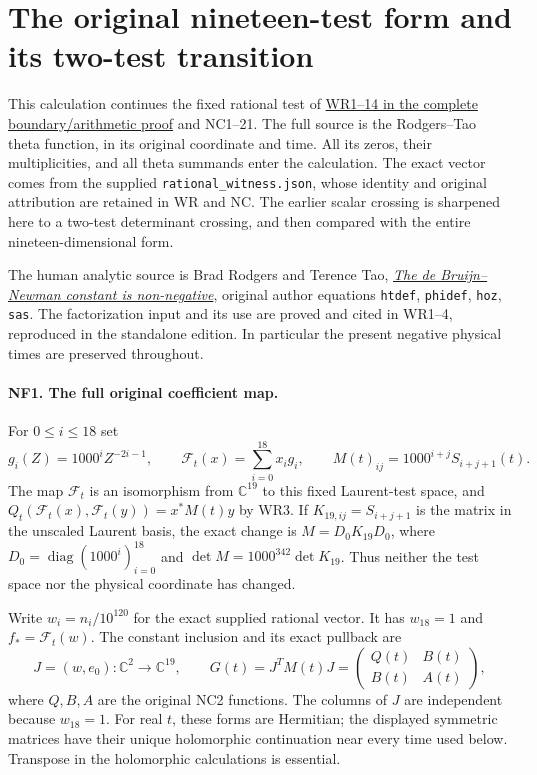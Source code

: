 \section{The original nineteen-test form and its two-test transition}
\label{sec:native-full-flag}

This calculation continues the fixed rational test of
\href{https://github.com/KokunoYumeto/zeta-function-research-reader/blob/87e386271c488ce5914b9926c4d23d0857e0c367/workbenches/splitzero-tandem/continuations/20260923-boundary-residue-arithmetic/BOUNDARY_RESIDUE_ARITHMETIC_RECEIVERS.tex}
{WR1--14 in the complete boundary/arithmetic proof} and
NC1--21. The full source is the Rodgers--Tao theta function, in its
original coordinate and time. All its zeros, their multiplicities,
and all theta summands enter the calculation. The exact vector comes
from the supplied \texttt{rational\_witness.json}, whose identity and
original attribution are retained in WR and NC. The earlier scalar
crossing is sharpened here to a two-test determinant crossing, and
then compared with the entire nineteen-dimensional form.

The human analytic source is Brad Rodgers and Terence Tao,
\href{https://arxiv.org/abs/1801.05914v5}{\emph{The de Bruijn--Newman
constant is non-negative}}, original author equations
\texttt{htdef}, \texttt{phidef}, \texttt{hoz}, \texttt{sas}.
The factorization input and its use are proved and cited in WR1--4,
reproduced in the standalone edition. In particular the present
negative physical times are preserved throughout.

\paragraph{NF1. The full original coefficient map.}
For $0\le i\le18$ set
\[
 g_i(Z)=1000^iZ^{-2i-1},\qquad
 \mathcal F_t(x)=\sum_{i=0}^{18}x_i g_i,
 \qquad M(t)_{ij}=1000^{i+j}S_{i+j+1}(t).
 \tag{NF1}
\]
The map $\mathcal F_t$ is an isomorphism from $\mathbb C^{19}$ to
this fixed Laurent-test space, and
$Q_t(\mathcal F_t(x),\mathcal F_t(y))=x^*M(t)y$ by WR3.
If $K_{19,ij}=S_{i+j+1}$ is the matrix in the unscaled Laurent
basis, the exact change is $M=D_0K_{19}D_0$, where
$D_0=\operatorname{diag}(1000^i)_{i=0}^{18}$ and
$\det M=1000^{342}\det K_{19}$. Thus neither the test space nor
the physical coordinate has changed.

Write $w_i=n_i/10^{120}$ for the exact supplied rational vector.
It has $w_{18}=1$ and $f_* =\mathcal F_t(w)$. The constant
inclusion and its exact pullback are
\[
 J=(w,e_0):\mathbb C^2\longrightarrow\mathbb C^{19},\qquad
 G(t)=J^TM(t)J=
 \begin{pmatrix}Q(t)&B(t)\\B(t)&A(t)\end{pmatrix},
 \tag{NF2}
\]
where $Q,B,A$ are the original NC2 functions. The columns of $J$
are independent because $w_{18}=1$. For real $t$, these forms are
Hermitian; the displayed symmetric matrices have their unique
holomorphic continuation near every time used below. Transpose in
the holomorphic calculations is essential.


